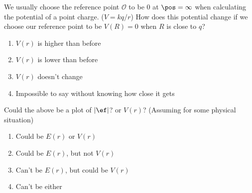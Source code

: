 \documentclass[pdf,aspectratio=169]{beamer}
\begin{document}
\begin{frame}{}
	We usually choose the reference point $\mathcal{O}$ to be 0 at $\pos=\infty$ when calculating the potential of a point charge. ($V = kq/r$) How does this potential change if we choose our reference point to be $V(R)=0$ when $R$ is close to $q$?
	\begin{enumerate}
		\item $V(r)$ is higher than before
		\item \alert<2>{$V(r)$ is lower than before}
		\item $V(r)$ doesn't change
		\item Impossible to say without knowing how close it gets
	\end{enumerate}
\end{frame}

\begin{frame}{}
	\begin{center}
	\end{center}
	Could the above be a plot of $\abs{\ef}$? or $V(r)$? (Assuming for some physical situation)
	\begin{enumerate}
		\item Could be $E(r)$ or $V(r)$
		\item \alert<2>{Could be $E(r)$, but not $V(r)$}
		\item Can't be $E(r)$, but could be $V(r)$
		\item Can't be either
	\end{enumerate}
\end{frame}
\end{document}
